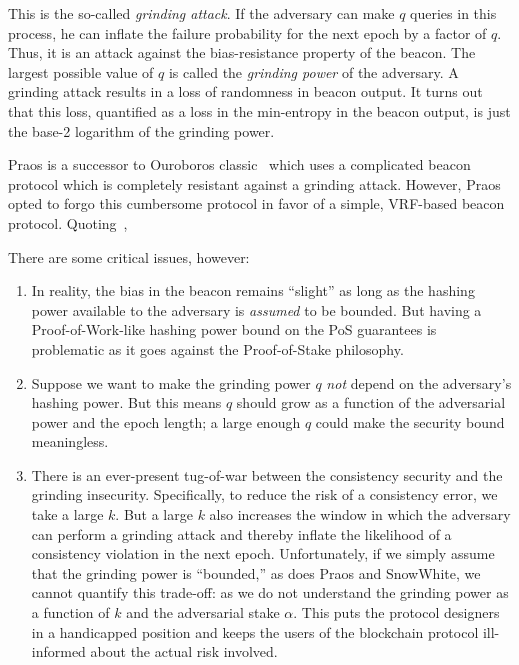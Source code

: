This is the so-called \emph{grinding attack}. 
If the adversary can make $q$ queries in this process, 
he can inflate the failure probability for the next epoch by a factor of $q$. 
Thus, it is an attack against the bias-resistance property of the beacon. 
The largest possible value of $q$ is called the \emph{grinding power} of the adversary.
A grinding attack results in a loss of randomness in beacon output.
It turns out that this loss, quantified as a loss in the min-entropy in the beacon output, 
is just the base-2 logarithm of the grinding power.


Praos is a successor to Ouroboros classic~\cite{Ouroboros} which uses 
a complicated beacon protocol which is completely resistant against a grinding attack. 
However, Praos opted to forgo this cumbersome protocol in favor of a simple, VRF-based beacon protocol. 
Quoting~\cite{Praos}, 


There are some critical issues, however:
\begin{enumerate}
  \item In reality, the bias in the beacon remains ``slight'' as long as 
  the hashing power available to the adversary is \emph{assumed} to be bounded.
  But having a Proof-of-Work-like hashing power bound on the PoS guarantees is problematic 
  as it goes against the Proof-of-Stake philosophy.

  \item Suppose we want to make the grinding power $q$ \emph{not} depend on the adversary's hashing power. 
  But this means $q$ should grow as a function of the adversarial power 
  and the epoch length; 
  a large enough $q$ could make the security bound meaningless. 

  \item There is an ever-present tug-of-war between the consistency security and the grinding insecurity. 
  Specifically, to reduce the risk of a consistency error, we take a large $k$. 
  But a large $k$ also increases the window in which the adversary can perform a grinding attack 
  and thereby inflate the likelihood of a consistency violation in the next epoch. 
  Unfortunately, 
  if we simply assume that the grinding power is ``bounded,'' 
  as does Praos and SnowWhite, 
  we cannot quantify this trade-off: 
  as we do not understand the grinding power as a function of $k$ and the adversarial stake $\alpha$.
  This puts the protocol designers in a handicapped position 
  and keeps the users of the blockchain protocol ill-informed about the actual risk involved. 
\end{enumerate}

